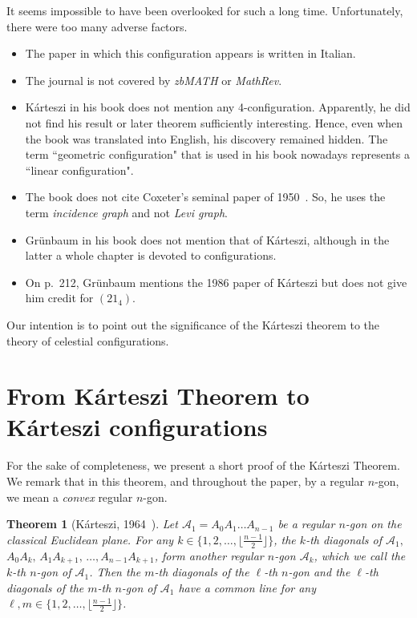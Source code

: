 \documentclass[12pt]{article}
\newtheorem{thm}                   {Theorem} %
\theoremstyle{definition} \newtheorem*{definition}              {Definition}
\theoremstyle{definition} \newtheorem {remark}                   {Remark}
\theoremstyle{definition} \newtheorem*{problem}                {Problem}
\theoremstyle{definition} \newtheorem{example}     [thm]{Example}
\begin{document}
It seems impossible to have been overlooked for such a long time. Unfortunately, there were too many adverse
factors. 

\begin{itemize}
\item 
The paper in which this configuration appears is written in Italian.
\item
The journal is not covered by \emph{zbMATH} or \emph{MathRev}.
\item
Kárteszi in his book does not mention any 4-configuration. Apparently, he did not find his result or later 
theorem sufficiently interesting. Hence, even when the book was translated into English, his discovery 
remained hidden. The term ``geometric configuration" that is used in his book nowadays represents a 
``linear configuration".
\item
The book does not cite Coxeter's seminal paper of 1950~\cite{Cox1950}. So, he uses the term \emph{incidence graph} 
and not \emph{Levi graph}. 
\item
Grünbaum in his book does not mention that of Kárteszi, although in the latter a whole chapter is devoted to 
configurations.
\item
On p.\ 212, Grünbaum mentions the 1986 paper of Kárteszi but does not give him credit for $(21_4)$.
\end{itemize}

Our intention is to point out the significance of the Kárteszi theorem to the theory of celestial configurations.



\section{From Kárteszi Theorem to Kárteszi configurations} \label{sect:K}


For the sake of completeness, we present a short proof of the K\'arteszi Theorem.
We remark that in this theorem, and throughout the paper, by a regular $n$-gon, we mean a \emph{convex} 
regular $n$-gon.

\begin{thm}[Kárteszi, 1964~\cite{Kar65}]
\label{thm:chord-belt}
Let $\mathcal{A}_1=A_0A_1\dots A_{n-1}$ be a regular $n$-gon on the classical Euclidean plane. For any
$k\in \{1,2,\dots , \lfloor\frac{n-1}{2}\rfloor \}$, 
the $k$-th diagonals of 
$\mathcal{A}_1,$ $A_0A_k,\, A_1A_{k+1},\, \dots ,A_{n-1}A_{k+1}$, 
form another regular $n$-gon $\mathcal{A}_k$, which we call the $k$-th $n$-gon of $\mathcal{A}_1$. 
Then the $m$-th diagonals of the $\ell $-th $n$-gon and the $\ell$-th diagonals of the $m$-th 
$n$-gon of $\mathcal{A}_1$ have a common line for any 
$\ell ,m \in \{1,2,\dots, \lfloor\frac{n-1}{2}\rfloor \}$.
\end{thm}
\end{document}
